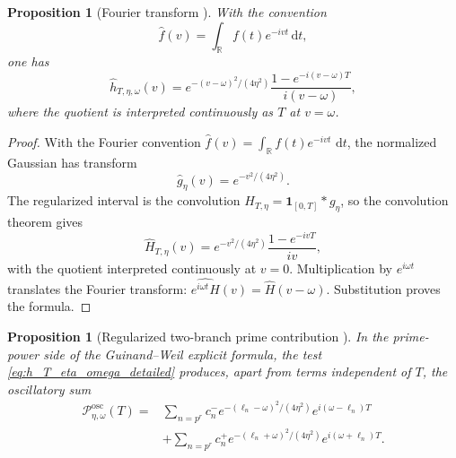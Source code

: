 \documentclass[11pt]{amsart}
\numberwithin{equation}{section}
\theoremstyle{plain}
\newtheorem{proposition}[theorem]{Proposition}
\theoremstyle{definition}
\theoremstyle{remark}
\newcommand{\1}{\mathbf{1}}
\newcommand{\dd}{\,\mathrm{d}}
\newcommand{\cP}{\mathcal P}
\begin{document}
\begin{proposition}[Fourier transform {}]
\label{prop:gaussian_fourier_transform}
With the convention
\begin{equation}
\widehat f(v)=\int_{\mathbb R}f(t)e^{-ivt}\dd t,
\label{eq:fourier_convention}
\end{equation}
one has
\begin{equation}
\boxed{
\widehat h_{T,\eta,\omega}(v)
=
e^{-(v-\omega)^2/(4\eta^2)}
\frac{1-e^{-i(v-\omega)T}}{i(v-\omega)},
}
\label{eq:exact_gaussian_fourier_transform}
\end{equation}
where the quotient is interpreted continuously as $T$ at $v=\omega$.
\end{proposition}

\begin{proof}
With the Fourier convention
\(\widehat f(v)=\int_{\mathbb R}f(t)e^{-ivt}\,\dd t\), the normalized
Gaussian has transform
\begin{equation}
\widehat g_\eta(v)=e^{-v^2/(4\eta^2)}.
\label{eq:gaussian_transform_proof}
\end{equation}
The regularized interval is the convolution
\(H_{T,\eta}=\1_{[0,T]}*g_\eta\), so the convolution theorem gives
\begin{equation}
\widehat H_{T,\eta}(v)
=
e^{-v^2/(4\eta^2)}
\frac{1-e^{-ivT}}{iv},
\label{eq:interval_gaussian_transform_proof}
\end{equation}
with the quotient interpreted continuously at \(v=0\).  Multiplication by
\(e^{i\omega t}\) translates the Fourier transform:
\(\widehat{e^{i\omega t}H}(v)=\widehat H(v-\omega)\).  Substitution proves
the formula.
\end{proof}


\begin{proposition}[Regularized two-branch prime contribution {}]
\label{prop:regularized_two_branches}
In the prime-power side of the Guinand--Weil explicit formula, the test
\eqref{eq:h_T_eta_omega_detailed} produces, apart from terms independent of
$T$, the oscillatory sum
\begin{align}
\cP_{\eta,\omega}^{\mathrm{osc}}(T)
={}&
\sum_{n=p^r}
c_n^-e^{-(\ell_n-\omega)^2/(4\eta^2)}
e^{i(\omega-\ell_n)T}
\label{eq:regularized_minus_branch}
\\
&+
\sum_{n=p^r}
c_n^+e^{-(\ell_n+\omega)^2/(4\eta^2)}
e^{i(\omega+\ell_n)T}.
\label{eq:regularized_plus_branch}
\end{align}
\end{proposition}
\end{document}
